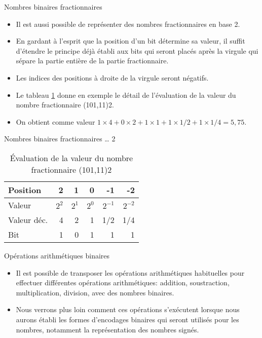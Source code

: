 \documentclass[presentation]{beamer}
\begin{document}
\begin{frame}[label={sec:orgec8b4f1}]{Nombres binaires fractionnaires}
\begin{itemize}
\item Il est aussi possible de représenter des nombres fractionnaires en base 2.

\item En gardant à l'esprit que la position d'un bit détermine sa valeur, il suffit d'étendre le principe déjà établi aux bits qui seront placés après la virgule qui sépare la partie entière de la partie fractionnaire.

\item Les indices des positions à droite de la virgule seront négatifs.

\item Le tableau \ref{tab:org5d944e0} donne en exemple le détail de l'évaluation de la valeur du nombre fractionnaire (101,11)2.

\item On obtient comme valeur \(1 \times 4 + 0 \times 2 + 1 \times 1 + 1 \times 1/2 + 1 \times 1/4 = 5,75\).
\end{itemize}
\end{frame}

\begin{frame}[label={sec:orgb7d644f}]{Nombres binaires fractionnaires \ldots{} 2}
\begin{table}[htbp]
\caption{\label{tab:org5d944e0}Évaluation de la valeur du nombre fractionnaire (101,11)2}
\centering
\begin{tabular}{lrrrrr}
Position & 2 & 1 & 0 & -1 & -2\\[0pt]
\hline
Valeur & \(2^2\) & \(2^1\) & \(2^0\) & \(2^{-1}\) & \(2^{-2}\)\\[0pt]
Valeur déc. & 4 & 2 & 1 & 1/2 & 1/4\\[0pt]
Bit & 1 & 0 & 1 & 1 & 1\\[0pt]
\end{tabular}
\end{table}
\end{frame}

\begin{frame}[label={sec:org60138c0}]{Opérations arithmétiques binaires}
\begin{itemize}
\item Il est possible de transposer les opérations arithmétiques habituelles pour effectuer différentes opérations arithmétiques: addition, soustraction, multiplication, division, avec des nombres binaires.

\item Nous verrons plus loin comment ces opérations s'exécutent lorsque nous aurons établi les formes d'encodages binaires qui seront utilisés pour les nombres, notamment la représentation des nombres signés.
\end{itemize}
\end{frame}
\end{document}
